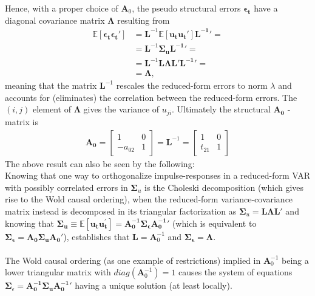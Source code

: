 \documentclass[a4paper,11pt,listof=nochaptergap,oneside,pointednumbers,bibtotoc,bigheadings,liststotoc]{scrbook}
\theoremstyle{mysatz}
\theoremstyle{mydefinition}
\theoremstyle{mybemerkung}
\newcommand{\vect}[1]{\boldsymbol{\mathbf{#1}}}
\begin{document}
\begin{itemize}
Hence, with a proper choice of $\vect{A}_0$, the pseudo structural errors $\vect{\epsilon_t}$ have a diagonal covariance matrix $\vect{\Lambda}$ resulting from 
\begin{equation} \label{eq:svar22}
\begin{split}
	\mathbb{E}[\vect{\epsilon_t}\vect{\epsilon_t}'] & = \vect{L}^{-1} \mathbb{E}[\vect{u_t}\vect{u_t}']\vect{L^{-1}}' = \\
										& = \vect{L}^{-1} \vect{\Sigma_u} \vect{L^{-1}}' = \\
										& = \vect{L}^{-1} \vect{L \Lambda L}' \vect{L^{-1}}' = \\
										& = \vect{\Lambda},
\end{split}								
\end{equation}
meaning that the matrix $\vect{L}^{-1}$ rescales the reduced-form errors to norm $\lambda$ and accounts for (eliminates) the correlation between the reduced-form errors. The $(i, j)$ element of $\vect{\Lambda}$ gives the variance of $u_{ji}$. Ultimately the structural $\vect{A_0}$ - matrix is
\begin{equation} \label{eq:svar23}
\begin{split}
	\vect{A_0} = \begin{bmatrix}
    					1 & 0 \\
					-a_{02} & 1
 					\end{bmatrix} = 
					\vect{L}^{-1} = 
						\begin{bmatrix}
    						1 & 0 \\
						t_{21} & 1
 						\end{bmatrix}
\end{split}								
\end{equation}
The above result can also be seen by the following:\\
Knowing that one way to orthogonalize impulse-responses in a reduced-form VAR with possibly correlated errors in $\vect{\Sigma}_u$ is the Choleski decomposition (which gives rise to the Wold causal ordering), when the reduced-form variance-covariance matrix instead is decomposed in its triangular factorization as $\vect{\Sigma}_u = \vect{L}\vect{\Lambda}\vect{L}'$ and knowing that $\vect{\Sigma_u}  \equiv \mathbb{E}[\vect{u_t}\vect{u_t^'}]= \vect{A_0^{-1}}\vect{\Sigma_\epsilon}\vect{A_0^{-1}}'$ (which is equivalent to $\vect{\Sigma_\epsilon} = \vect{A_0}\vect{\Sigma_u}\vect{A_0}'$), establishes that $\vect{L} = \vect{A}_0^{-1}$ and $\vect{\Sigma_\epsilon} = \vect{\Lambda}$. 
\\
\\
The Wold causal ordering (as one example of restrictions) implied in $\vect{A}_0^{-1}$ being a lower triangular matrix with $diag(\vect{A}_0^{-1}) = 1$ causes the system of equations $\vect{\Sigma}_\epsilon  = \vect{A_0^{-1}}\vect{\Sigma_u}\vect{A_0^{-1}}'$ having a unique solution (at least locally).



\end{itemize}
\end{document}
